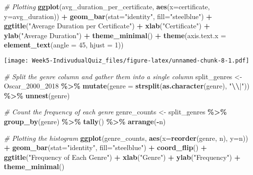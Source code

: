 \documentclass[
]{article}
\newenvironment{Shaded}{\begin{snugshade}}{\end{snugshade}}
\newcommand{\AttributeTok}[1]{\textcolor[rgb]{0.13,0.29,0.53}{#1}}
\newcommand{\CommentTok}[1]{\textcolor[rgb]{0.56,0.35,0.01}{\textit{#1}}}
\newcommand{\DecValTok}[1]{\textcolor[rgb]{0.00,0.00,0.81}{#1}}
\newcommand{\FunctionTok}[1]{\textcolor[rgb]{0.13,0.29,0.53}{\textbf{#1}}}
\newcommand{\NormalTok}[1]{#1}
\newcommand{\OtherTok}[1]{\textcolor[rgb]{0.56,0.35,0.01}{#1}}
\newcommand{\SpecialCharTok}[1]{\textcolor[rgb]{0.81,0.36,0.00}{\textbf{#1}}}
\newcommand{\StringTok}[1]{\textcolor[rgb]{0.31,0.60,0.02}{#1}}
\begin{document}
\begin{Shaded}
\begin{Highlighting}[]
\CommentTok{\# Plotting}
\FunctionTok{ggplot}\NormalTok{(avg\_duration\_per\_certificate, }\FunctionTok{aes}\NormalTok{(}\AttributeTok{x=}\NormalTok{certificate, }\AttributeTok{y=}\NormalTok{avg\_duration)) }\SpecialCharTok{+}
  \FunctionTok{geom\_bar}\NormalTok{(}\AttributeTok{stat=}\StringTok{"identity"}\NormalTok{, }\AttributeTok{fill=}\StringTok{"steelblue"}\NormalTok{) }\SpecialCharTok{+}
  \FunctionTok{ggtitle}\NormalTok{(}\StringTok{"Average Duration per Certificate"}\NormalTok{) }\SpecialCharTok{+}
  \FunctionTok{xlab}\NormalTok{(}\StringTok{"Certificate"}\NormalTok{) }\SpecialCharTok{+}
  \FunctionTok{ylab}\NormalTok{(}\StringTok{"Average Duration"}\NormalTok{) }\SpecialCharTok{+}
  \FunctionTok{theme\_minimal}\NormalTok{() }\SpecialCharTok{+}
  \FunctionTok{theme}\NormalTok{(}\AttributeTok{axis.text.x =} \FunctionTok{element\_text}\NormalTok{(}\AttributeTok{angle =} \DecValTok{45}\NormalTok{, }\AttributeTok{hjust =} \DecValTok{1}\NormalTok{))}
\end{Highlighting}
\end{Shaded}

\texttt{[image: Week5-IndivudualQuiz\_files/figure-latex/unnamed-chunk-8-1.pdf]}

\begin{Shaded}
\begin{Highlighting}[]
\CommentTok{\# Split the genre column and gather them into a single column}
\NormalTok{split\_genres }\OtherTok{\textless{}{-}}\NormalTok{ Oscar\_2000\_2018 }\SpecialCharTok{\%\textgreater{}\%}
  \FunctionTok{mutate}\NormalTok{(}\AttributeTok{genre =} \FunctionTok{strsplit}\NormalTok{(}\FunctionTok{as.character}\NormalTok{(genre), }\StringTok{"}\SpecialCharTok{\textbackslash{}\textbackslash{}}\StringTok{|"}\NormalTok{)) }\SpecialCharTok{\%\textgreater{}\%}
  \FunctionTok{unnest}\NormalTok{(genre)}

\CommentTok{\# Count the frequency of each genre}
\NormalTok{genre\_counts }\OtherTok{\textless{}{-}}\NormalTok{ split\_genres }\SpecialCharTok{\%\textgreater{}\%}
  \FunctionTok{group\_by}\NormalTok{(genre) }\SpecialCharTok{\%\textgreater{}\%}
  \FunctionTok{tally}\NormalTok{() }\SpecialCharTok{\%\textgreater{}\%}
  \FunctionTok{arrange}\NormalTok{(}\SpecialCharTok{{-}}\NormalTok{n)}

\CommentTok{\# Plotting the histogram}
\FunctionTok{ggplot}\NormalTok{(genre\_counts, }\FunctionTok{aes}\NormalTok{(}\AttributeTok{x=}\FunctionTok{reorder}\NormalTok{(genre, n), }\AttributeTok{y=}\NormalTok{n)) }\SpecialCharTok{+}
  \FunctionTok{geom\_bar}\NormalTok{(}\AttributeTok{stat=}\StringTok{"identity"}\NormalTok{, }\AttributeTok{fill=}\StringTok{"steelblue"}\NormalTok{) }\SpecialCharTok{+}
  \FunctionTok{coord\_flip}\NormalTok{() }\SpecialCharTok{+}
  \FunctionTok{ggtitle}\NormalTok{(}\StringTok{"Frequency of Each Genre"}\NormalTok{) }\SpecialCharTok{+}
  \FunctionTok{xlab}\NormalTok{(}\StringTok{"Genre"}\NormalTok{) }\SpecialCharTok{+}
  \FunctionTok{ylab}\NormalTok{(}\StringTok{"Frequency"}\NormalTok{) }\SpecialCharTok{+}
  \FunctionTok{theme\_minimal}\NormalTok{()}
\end{Highlighting}
\end{Shaded}
\end{document}
